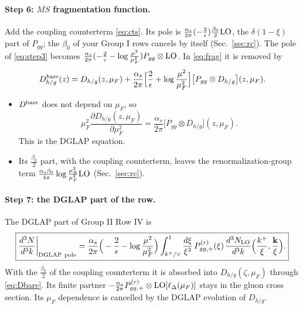 \documentclass[10pt]{article}
\numberwithin{equation}{section}
\newcommand{\LO}{{\rm LO}}
\begin{document}
\paragraph{Step 6: $\overline{MS}$ fragmentation function.} Add the coupling counterterm \eqref{eq:cts}. Its pole is $\frac{\alpha_s}{2\pi}(-\frac2\epsilon)\frac{\beta_0}{2}\LO$, the $\delta(1-\xi)$ part of $P_{gg}$; the $\beta_0$ of your Group I rows cancels by itself (Sec.~\ref{sec:rc}). The pole of \eqref{eq:step3} becomes $\frac{\alpha_s}{2\pi}(-\frac2\epsilon-\log\frac{\mu^2}{\mu_F^2})P_{gg}\otimes\LO$. In \eqref{eq:frag} it is removed by
\begin{equation}
D^{\rm bare}_{h/g}(z)=D_{h/g}(z,\mu_F)+\frac{\alpha_s}{2\pi}\Big[\frac2\epsilon+\log\frac{\mu^2}{\mu_F^2}\Big]\big[P_{gg}\otimes D_{h/g}\big](z,\mu_F).\label{eq:Dbare}
\end{equation}
\begin{itemize}
\item $D^{\rm bare}$ does not depend on $\mu_F$, so
\begin{equation}
\mu_F^2\frac{\partial D_{h/g}(z,\mu_F)}{\partial\mu_F^2}=\frac{\alpha_s}{2\pi}\big[P_{gg}\otimes D_{h/g}\big](z,\mu_F).
\end{equation}
This is the DGLAP equation.
\item Its $\frac{\beta_0}{2}$ part, with the coupling counterterm, leaves the renormalization-group term $\frac{\alpha_s\beta_0}{4\pi}\log\frac{\mu_R^2}{\mu_F^2}\LO$ (Sec.~\ref{sec:rc}).
\end{itemize}

\paragraph{Step 7: the DGLAP part of the row.} The DGLAP part of Group II Row IV is
\begin{equation}
\boxed{\frac{d^3N}{d^3k}\bigg|_{\rm DGLAP\ pole}=\frac{\alpha_s}{2\pi}\Big(-\frac{2}{\epsilon}-\log\frac{\mu^2}{\mu_F^2}\Big)\int_{k^+/\vee}^1\frac{d\xi}{\xi^3}\,P^{(r)}_{gg,+}(\xi)\,\frac{d^3N_{\rm LO}}{d^3k}\Big(\frac{k^+}{\xi},\frac{\mathbf k}{\xi}\Big).}
\end{equation}
With the $\frac{\beta_0}{2}$ of the coupling counterterm it is absorbed into $D_{h/g}(\zeta,\mu_F)$ through \eqref{eq:Dbare}. Its finite partner $-\frac{\alpha_s}{2\pi}P^{(r)}_{gg,+}\otimes\LO[\ell_\Delta(\mu_F)]$ stays in the gluon cross section. Its $\mu_F$ dependence is cancelled by the DGLAP evolution of $D_{h/g}$.
\end{document}
